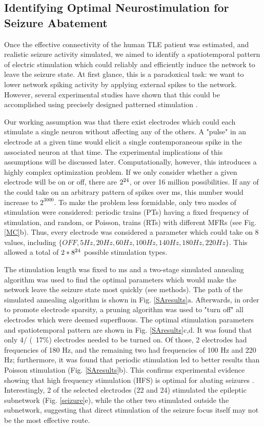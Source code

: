 \documentclass[11pt,a4paper,final]{article}
\begin{document}
    \subsection{Identifying Optimal Neurostimulation for Seizure Abatement}

Once the effective connectivity of the human TLE patient was estimated, and realistic seizure activity simulated, we aimed to identify a spatiotemporal pattern of electric stimulation which could reliably and efficiently induce the network to leave the seizure state.
At first glance, this is a paradoxical task: we want to lower network spiking activity by applying external spikes to the network.
However, several experimental studies have shown that this could be accomplished using precisely designed patterned stimulation \citep{durand01,heck14}.

Our working assumption was that there exist \nn{} electrodes which could each stimulate a single neuron without affecting any of the others.
A "pulse" in an electrode at a given time would elicit a single contemporaneous spike in the associated neuron at that time.
The experimental implications of this assumptions will be discussed later.
Computationally, however, this introduces a highly complex optimization problem.
If we only consider whether a given electrode will be on or off, there are $2^{24{}}$, or over 16 million possibilities.
If any of the \nn{} could take on an arbitrary pattern of spikes over \len{}ms, this number would increase to $2^{3000}$.
To make the problem less formidable, only two modes of stimulation were considered: periodic trains (PTs) having a fixed frequency of stimulation, and random, or Poisson, trains (RTs) with different MFRs (see Fig. \ref{MC}b).
Thus, every electrode was considered a parameter which could take on 8 values, including $\{OFF, 5 Hz, 20 Hz, 60 Hz, 100 Hz, 140 Hz, 180 Hz, 220 Hz\}$.
This allowed a total of $2*8^{24{}}$ possible stimulation types.

The stimulation length was fixed to \len{} ms and a two-stage simulated annealing algorithm was used to find the optimal parameters which would make the network leave the seizure state most quickly (see methods).
The path of the simulated annealing algorithm is shown in Fig. \ref{SAresults}a.
Afterwards, in order to promote electrode sparsity, a pruning algorithm was used to "turn off" all electrodes which were deemed superfluous.
The optimal stimulation parameters and spatiotemporal pattern are shown in Fig. \ref{SAresults}c,d.
It was found that only 4/\nn{} (~17\%) electrodes needed to be turned on.
Of those, 2 electrodes had frequencies of 180 Hz, and the remaining two had frequencies of 100 Hz and 220 Hz; furthermore, it was found that periodic stimulation led to better results than Poisson stimulation (Fig. \ref{SAresults}b).
This confirms experimental evidence showing that high frequency stimulation (HFS) is optimal for abating seizures \citep{durand01}.
Interestingly, 2 of the selected electrodes (22 and 24) stimulated the epileptic subnetwork (Fig. \ref{seizure}e), while the other two stimulated outside the subnetwork, suggesting that direct stimulation of the seizure focus itself may not be the most effective route.
\end{document}

